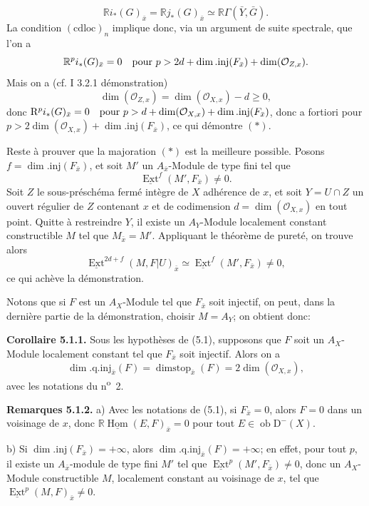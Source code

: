 \documentclass[11pt]{article}
\DeclareMathOperator{\Hom}{Hom}
\DeclareMathOperator{\Ext}{Ext}
\newcommand{\R}{\mathbb{R}}\newcommand{\RHomCore}{\mathbb{R}\mathrm{Hom}}
\newcommand{\D}{\mathrm{D}}
\newcommand{\ob}{\operatorname{ob}}
\providecommand{\Hom}{\operatorname{Hom}}
\providecommand{\ob}{\operatorname{ob}}
\providecommand{\R}{\mathrm R}
\providecommand{\Hom}{\operatorname{Hom}}
\begin{document}
\[
        \R i_*(G)_{\bar{x}}=\R j_*(G)_{\bar{x}}\simeq \R\Gamma(\bar{Y},\bar{G}).
\]
La condition $(\mathrm{cdloc})_n$ implique donc, via un argument de suite spectrale, que l'on a
\[
        \R^p i_*(G)_{\bar{x}}=0\quad\hbox{pour }p>2d+\dim.\mathrm{inj}(F_{\bar{x}})+\dim(\mathcal{O}_{Z,x}).
\]
Mais on a (cf. I 3.2.1 démonstration)
\[
        \dim(\mathcal{O}_{Z,x})=\dim(\mathcal{O}_{X,x})-d\geq0,
\]
donc $\mathrm{R}^p i_*(G)_{\bar{x}}=0\quad\hbox{pour }p>d+\dim(\mathcal{O}_{X,x})+\dim.\mathrm{inj}(F_{\bar{x}})$,
donc a fortiori pour $p>2\dim(\mathcal{O}_{X,x})+\dim.\mathrm{inj}(F_{\bar{x}})$, ce qui démontre $(*)$.

Reste à prouver que la majoration $(*)$ est la meilleure possible. Posons $f=\dim.\mathrm{inj}(F_{\bar{x}})$, et soit $M'$ un $A_{\bar{x}}$-Module de type fini tel que
\[
        \underline{\Ext}^f(M',F_{\bar{x}})\neq0.
\]
Soit $Z$ le sous-préschéma fermé intègre de $X$ adhérence de $x$, et soit $Y=U\cap Z$ un ouvert régulier de $Z$ contenant $x$ et de codimension $d=\dim(\mathcal{O}_{X,x})$ en tout point. Quitte à restreindre $Y$, il existe un $A_Y$-Module localement constant constructible $M$ tel que $M_{\bar{x}}=M'$. Appliquant le théorème de pureté, on trouve alors
\[
        \underline{\Ext}^{2d+f}(M,F|U)_{\bar{x}}\simeq \underline{\Ext}^f(M',F_{\bar{x}})\neq0,
\]
ce qui achève la démonstration.

Notons que si $F$ est un $A_X$-Module tel que $F_{\bar{x}}$ soit injectif, on peut, dans la dernière partie de la démonstration, choisir $M=A_Y$; on obtient donc:

\textbf{Corollaire 5.1.1.} Sous les hypothèses de (5.1), supposons que $F$ soit un $A_X$-Module localement constant tel que $F_{\bar{x}}$ soit injectif. Alors on a
\[
        \dim.\mathrm{q.inj}_{\bar{x}}(F)=\operatorname{dimstop}_{\bar{x}}(F)=2\dim(\mathcal{O}_{X,x}),
\]
avec les notations du n\textsuperscript{o}~2.

\textbf{Remarques 5.1.2.} a) Avec les notations de (5.1), si $F_{\bar{x}}=0$, alors $F=0$ dans un voisinage de $x$, donc $\R\underline{\Hom}(E,F)_{\bar{x}}=0$ pour tout $E\in\ob\D^{-}(X)$.

b) Si $\dim.\mathrm{inj}(F_{\bar{x}})=+\infty$, alors $\dim.\mathrm{q.inj}_{\bar{x}}(F)=+\infty$; en effet, pour tout $p$, il existe un $A_{\bar{x}}$-module de type fini $M'$ tel que $\underline{\Ext}^p(M',F_{\bar{x}})\neq0$, donc un $A_X$-Module constructible $M$, localement constant au voisinage de $x$, tel que $\underline{\Ext}^p(M,F)_{\bar{x}}\neq0$.
\end{document}
